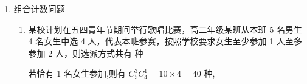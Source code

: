 \begin{enumerate}
\begin{enumerate}
\begin{jieda}
            所以原不等式可化为 ${3x}\left( {x - 1}\right) \left( {x - 2}\right)  \leq  {2x}\left( {x + 1}\right)  + {6x}\left( {x - 1}\right)$ ,
            
            所以 $3 \leq  x \leq  5$ ,
            
            所以原不等式的解集为 $\{ 3,4,5\}$ .
        \end{jieda}

        \item 不等式 $xP_{x}^{3} > 3P_{x}^{2}$ 的解集是
        \begin{jieda}
            由 $xP_{x}^{3} > 3P_{x}^{2}$ ,得 $\left\{  \begin{matrix} x\left\lbrack  {x\left( {x - 1}\right) \left( {x - 2}\right) }\right\rbrack   > 3\left\lbrack  {x\left( {x - 1}\right) }\right\rbrack  \\  x \geq  3 \\  x \in  {{N}}_{ + } \end{matrix}\right.$ ，解得 $x > 3,x \in  {{N}}_{ + }$
        \end{jieda}
        
        \item 不等式 $P_{8}^{x} < 6P_8^{x - 2}$ 的解集为
        \begin{jieda}
            由 $P_{8}^{x} < P_{8}^{x - 2}$ ,可得 $\dfrac{8!}{\left( {8 - x}\right) !} < 6 \times  \dfrac{8!}{\left( {{10} - x}\right) !}$ 整理得 ${x}^{2} - {19x} + {84} < 0$ ,解得 $7 < x < {12}$ , 又因为 $\left\{  \begin{matrix} x \leq  8 \\  x - 2 \geq  0 \end{matrix}\right.$ ,解得 $2 \leq  x \leq  8$ ,

            综上可得 $7 < x \leq  8$ ，又由 $x \in  {{N}}^{ * }$ 所以 $x = 8$ .
        \end{jieda}
    \end{enumerate}
    \item 组合计数问题
    \begin{enumerate}
        \item 某校计划在五四青年节期间举行歌唱比赛，高二年级某班从本班 5 名男生 4 名女生中选 4 人，代表本班参赛，按照学校要求女生至少参加 1 人至多参加 2 人，则选派方式共有 种
        \begin{jieda}
            若恰有 1 名女生参加,则有 ${{C}}_{5}^{3}{{C}}_{4}^{1} = {10} \times  4 = {40}$ 种,
            

\end{jieda}
\end{enumerate}
\end{enumerate}
